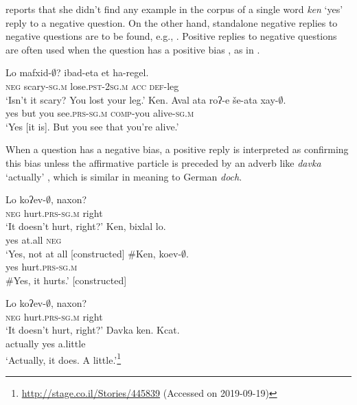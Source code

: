 \documentclass[output=paper,colorlinks,citecolor=brown]{langscibook}
\begin{document}
\citet[146]{Burstein1999} reports that she didn't find any example in the corpus of a single word \textit{ken} ‘yes' reply to a negative question. On the other hand, standalone negative replies to negative questions are to be found, e.g., . Positive replies to negative questions are often used when the question has a positive bias \citep[387]{Burstein1999}, as in .

\ea\label{ex:heb:16}
    \begin{xlist}[A: ]
    \label{ex:heb:16Q}
        \gll  Lo mafxid-${\emptyset}$? ibad-eta et ha-regel.\\ 
              \textsc{neg} scary-\textsc{sg.m} lose.\textsc{pst-2sg.m} \textsc{acc} \textsc{def}{}-leg\\ 
        \glt ‘Isn't it scary? You lost your leg.'
    \label{ex:heb:16A}
        \gll  Ken. Aval ata roʔ-e še-ata  xay-${\emptyset}$.\\ 
               yes but you see.\textsc{prs-sg.m} \textsc{comp}{}-you alive-\textsc{sg.m}\\
        \glt ‘Yes [it is]. But you see that you're alive.' \citep[388]{Burstein1999}
    \end{xlist}
\z 

When a question has a negative bias, a positive reply is interpreted as confirming this bias  unless the affirmative particle is preceded by an adverb like \textit{davka} ‘actually' , which is similar in meaning to German \textit{doch}.

\ea\label{ex:heb:17}
    \begin{xlist}[B2: ]
    \label{ex:heb:17A}
        \gll  Lo koʔev-${\emptyset}$, naxon?\\ 
              \textsc{neg} hurt.\textsc{prs-sg.m} right\\ 
        \glt ‘It doesn't hurt, right?'
    \label{ex:heb:17B}
        \gll  Ken, bixlal lo. \\ 
               yes at.all \textsc{neg} \\
        \glt ‘Yes, not at all  [constructed]
    \label{ex:heb:17C}
        \gll  \#Ken, koev-${\emptyset}$.\\ 
             yes hurt.\textsc{prs-sg.m}\\
        \glt \#Yes, it hurts.' [constructed]
    \end{xlist}
\z 

\ea\label{ex:heb:18}
    \begin{xlist}[A: ]
    \label{ex:heb:18A}
        \gll  Lo koʔev-${\emptyset}$, naxon?\\ 
              \textsc{neg} hurt.\textsc{prs-sg.m} right\\ 
        \glt ‘It doesn't hurt, right?'
    \label{ex:heb:18B}
        \gll  Davka ken. Kcat.\\ 
               actually yes a.little\\
        \glt ‘Actually, it does. A little.'\footnote{\url{http://stage.co.il/Stories/445839} (Accessed on 2019-09-19)}
    \end{xlist}
\z 
\end{document}
